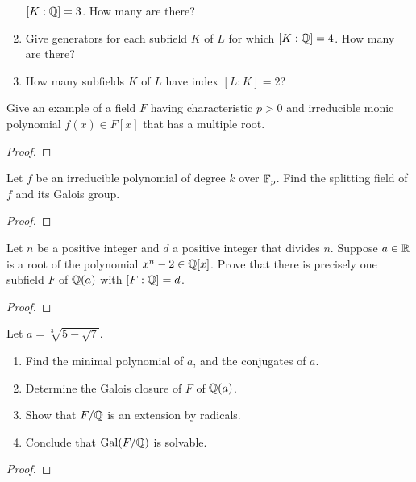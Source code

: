 \begin{problem}
\begin{enumerate}[label=(\alph*)]
  $[K:\mathbb{Q}]=3$. How many are there?
\item Give generators for each subfield $K$ of $L$ for which
  $[K:\mathbb{Q}]=4$. How many are there?
\item How many subfields $K$ of $L$ have index $[L:K]=2$?
\end{enumerate}
\end{problem}

\begin{problem}
Give an example of a field $F$ having characteristic $p>0$ and irreducible
monic polynomial $f(x)\in F[x]$ that has a multiple root.
\begin{proof}

\end{proof}
\end{problem}

\begin{problem}
Let $f$ be an irreducible polynomial of degree $k$ over $\mathbb{F}_p$. Find the
splitting field of $f$ and its Galois group.
\end{problem}
\begin{proof}
\end{proof}

\begin{problem}
Let $n$ be a positive integer and $d$ a positive integer that divides
$n$. Suppose $a\in\mathbb{R}$ is a root of the polynomial
$x^n-2\in\mathbb{Q}[x]$. Prove that there is precisely one subfield $F$ of
$\mathbb{Q}(a)$ with $[F:\mathbb{Q}]=d$.
\end{problem}
\begin{proof}
\end{proof}

\begin{problem}
Let $a=\sqrt[3]{5-\sqrt{7}}$.
\begin{enumerate}[label=(\alph*)]
\item Find the minimal polynomial of $a$, and the conjugates of $a$.
\item Determine the Galois closure of $F$ of $\mathbb{Q}(a)$.
\item Show that $F/\mathbb{Q}$ is an extension by radicals.
\item Conclude that $\operatorname{Gal}(F/\mathbb{Q})$ is solvable.
\end{enumerate}
\end{problem}
\begin{proof}
\end{proof}

